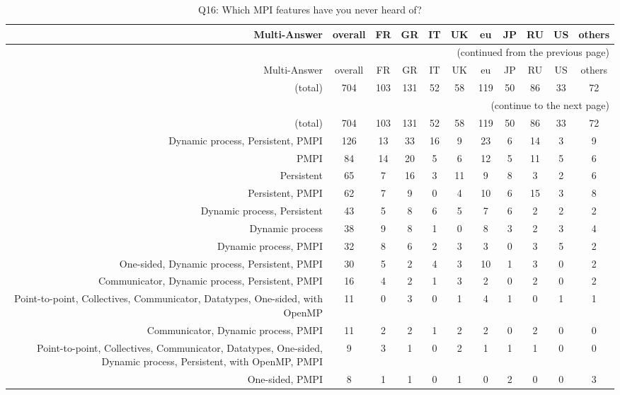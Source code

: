 \clearpage%
{\footnotesize\begin{landscape}%
\begin{longtable}[htb]{r|c|c|c|c|c|c|c|c|c|c}%
\caption{Q16: Which MPI features have you never heard of?}%
\label{tab:Q16-mans} \\%
\hline%
Multi-Answer & overall & FR & GR & IT & UK & eu & JP & RU & US & others \\
 \hline%
\endfirsthead%
\multicolumn{11}{r}{(continued from the previous page)}\\%
\hline%
Multi-Answer & overall & FR & GR & IT & UK & eu & JP & RU & US & others \\
 \hline%
\endhead%
\hline%
(total) & 704 & 103 & 131 & 52 & 58 & 119 & 50 & 86 & 33 & 72 \\%
\hline%
\multicolumn{11}{r}{(continue to the next page)}\\%
\endfoot%
\hline%
(total) & 704 & 103 & 131 & 52 & 58 & 119 & 50 & 86 & 33 & 72 \\%
\hline%
\endlastfoot%
\hline%
{Dynamic process, Persistent, PMPI} & 126 & 13 & 33 & 16 & 9 & 23 & 6 & 14 & 3 & 9 \\%
{PMPI} & 84 & 14 & 20 & 5 & 6 & 12 & 5 & 11 & 5 & 6 \\%
{Persistent} & 65 & 7 & 16 & 3 & 11 & 9 & 8 & 3 & 2 & 6 \\%
{Persistent, PMPI} & 62 & 7 & 9 & 0 & 4 & 10 & 6 & 15 & 3 & 8 \\%
{Dynamic process, Persistent} & 43 & 5 & 8 & 6 & 5 & 7 & 6 & 2 & 2 & 2 \\%
{Dynamic process} & 38 & 9 & 8 & 1 & 0 & 8 & 3 & 2 & 3 & 4 \\%
{Dynamic process, PMPI} & 32 & 8 & 6 & 2 & 3 & 3 & 0 & 3 & 5 & 2 \\%
{One-sided, Dynamic process, Persistent, PMPI} & 30 & 5 & 2 & 4 & 3 & 10 & 1 & 3 & 0 & 2 \\%
{Communicator, Dynamic process, Persistent, PMPI} & 16 & 4 & 2 & 1 & 3 & 2 & 0 & 2 & 0 & 2 \\%
{Point-to-point, Collectives, Communicator, Datatypes, One-sided, with OpenMP} & 11 & 0 & 3 & 0 & 1 & 4 & 1 & 0 & 1 & 1 \\%
{Communicator, Dynamic process, PMPI} & 11 & 2 & 2 & 1 & 2 & 2 & 0 & 2 & 0 & 0 \\%
{Point-to-point, Collectives, Communicator, Datatypes, One-sided, Dynamic process, Persistent, with OpenMP, PMPI} & 9 & 3 & 1 & 0 & 2 & 1 & 1 & 1 & 0 & 0 \\%
{One-sided, PMPI} & 8 & 1 & 1 & 0 & 1 & 0 & 2 & 0 & 0 & 3 \\%

\end{longtable}
\end{landscape}}

